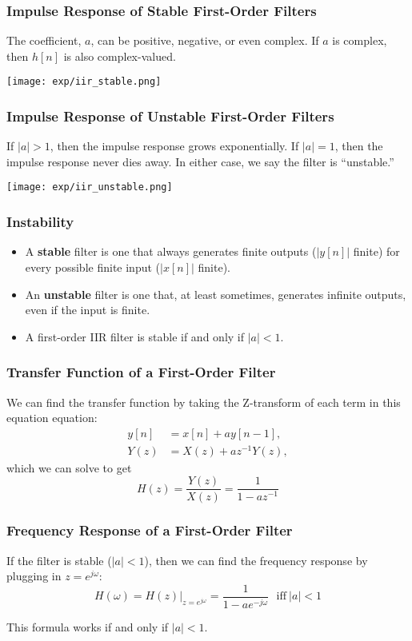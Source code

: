 \documentclass{beamer}
\begin{document}
\begin{frame}
  \frametitle{Impulse Response of Stable First-Order Filters}

  The coefficient, $a$, can be positive, negative, or even complex.
  If $a$ is complex, then $h[n]$ is also complex-valued.
  \centerline{\texttt{[image: exp/iir\_stable.png]}}

\end{frame}

\begin{frame}
  \frametitle{Impulse Response of Unstable First-Order Filters}

  If $|a|>1$, then the impulse response grows exponentially.  If
  $|a|=1$, then the impulse response never dies away.  In either case,
  we say the filter is ``unstable.''
  \centerline{\texttt{[image: exp/iir\_unstable.png]}}

\end{frame}

\begin{frame}
  \frametitle{Instability}

  \begin{itemize}
  \item A {\bf stable} filter is one that always generates finite
    outputs ($|y[n]|$ finite) for every possible finite input
    ($|x[n]|$ finite).
  \item An {\bf unstable} filter is one that, at least sometimes,
    generates infinite outputs, even if the input is finite.
  \item A first-order IIR filter is stable if and only if $|a|<1$.
  \end{itemize}
\end{frame}


\begin{frame}
  \frametitle{Transfer Function of a First-Order Filter}

  We can find the transfer function by taking the Z-transform of each
  term in this equation equation:
  \begin{align*}
  y[n] &= x[n] + ay[n-1],\\
  Y(z) &= X(z)+az^{-1} Y(z),
  \end{align*}
  which we can solve to get
  \[
  H(z)  = \frac{Y(z)}{X(z)} = \frac{1}{1-az^{-1}}
  \]
\end{frame}

\begin{frame}
  \frametitle{Frequency Response of a  First-Order Filter}

  If the filter is stable ($|a|<1$), then 
  we can find the frequency response by plugging in $z=e^{j\omega}$:
  \[
  H(\omega) = H(z)\vert_{z=e^{j\omega}}  =  \frac{1}{1-ae^{-j\omega}}~~~\mbox{iff}~|a|<1
  \]

  This formula works if and only if $|a|<1$.
\end{frame}
\end{document}
